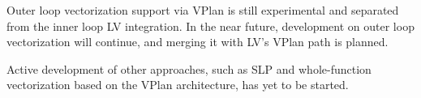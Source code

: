 \documentclass[sigplan,11pt,nonacm]{acmart}
\begin{document}
Outer loop vectorization support via VPlan is still experimental and separated from the inner loop
LV integration. In the near future, development on outer loop vectorization will continue, and merging 
it with LV's VPlan path is planned.

Active development of other approaches, such as SLP and whole-function vectorization based on the VPlan 
architecture, has yet to be started.




\end{document}
